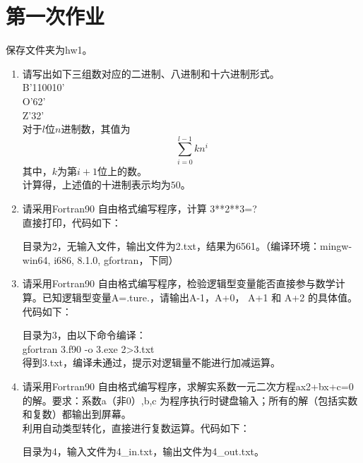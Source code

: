 \documentclass{ctexart}
\begin{document}
\section{第一次作业}
    
    保存文件夹为hw1。

    \begin{enumerate}

        \item
            请写出如下三组数对应的二进制、八进制和十六进制形式。\\
            B'110010'\\
            O'62'\\
            Z'32'\\

            对于$l$位$n$进制数，其值为
            \[\sum_{i=0}^{l-1} kn^i\]
            其中，$k$为第$i+1$位上的数。\\
            计算得，上述值的十进制表示均为$50$。

        \item
            请采用Fortran90 自由格式编写程序，计算 3**2**3=?\\

            直接打印，代码如下：

            目录为2，无输入文件，输出文件为2.txt，结果为6561。（编译环境：mingw-win64, i686, 8.1.0, gfortran，下同）

        \item
            请采用Fortran90 自由格式编写程序，检验逻辑型变量能否直接参与数学计算。已知逻辑型变量A=.ture.，请输出A-1，A+0， A+1 和 A+2 的具体值。\\

            代码如下：

            目录为3，由以下命令编译：\\gfortran 3.f90 -o 3.exe 2>3.txt\\
            得到3.txt，编译未通过，提示对逻辑量不能进行加减运算。

        \item
            请采用Fortran90 自由格式编写程序，求解实系数一元二次方程ax2+bx+c=0的解。要求：系数a（非0）,b,c 为程序执行时键盘输入；所有的解（包括实数和复数）都输出到屏幕。\\

            利用自动类型转化，直接进行复数运算。代码如下：

            目录为4，输入文件为4\_in.txt，输出文件为4\_out.txt。

    \end{enumerate}
\end{document}
